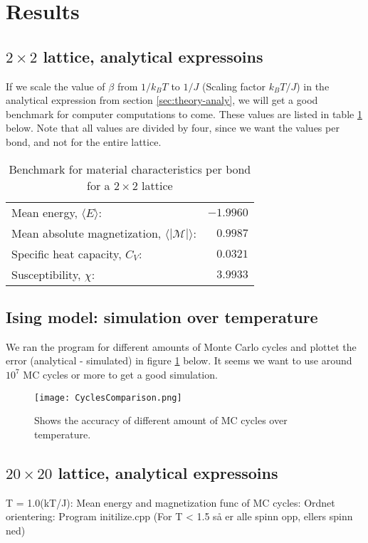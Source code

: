 \documentclass[../main.tex]{subfiles}
\begin{document}
\section{Results}
\subsection{$2 \times 2$ lattice, analytical expressoins}
If we scale the value of $\beta$ from $1/k_BT$ to $1/J$ (Scaling factor $k_B T/J$) in the analytical expression from section \ref{sec:theory-analy}, we will get a good benchmark for computer computations to come. These values are listed in table \ref{tab:2x2spinsEnergiesMags} below. Note that all values are divided by four, since we want the values per bond, and not for the entire lattice.
\begin{table}[!h]
\begin{center}
  \begin{tabular}{l r}
    Mean energy, $\langle E \rangle$: & $-1.9960$  \\
    Mean absolute magnetization, $\langle |\mathcal{M}| \rangle$: & $0.9987$ \\
    Specific heat capacity, $C_V$: & $0.0321$\\
    Susceptibility, $\chi$: & $3.9933$
  \end{tabular}
  \caption{Benchmark for material characteristics per bond for a $2 \times 2$ lattice}
  \label{tab:2x2spinsEnergiesMags}
\end{center}
\end{table}
\FloatBarrier

\subsection{Ising model: simulation over temperature}
We ran the program for different amounts of Monte Carlo cycles and plottet the error (analytical - simulated) in figure \ref{fig:results-MCplot} below. It seems we want to use around $10^{7}$ MC cycles or more to get a good simulation.

\begin{figure}[!h]
\texttt{[image: CyclesComparison.png]}
\caption{Shows the accuracy of different amount of MC cycles over temperature.}
\label{fig:results-MCplot}
\end{figure}
\FloatBarrier

\subsection{$20 \times 20$ lattice, analytical expressoins}
T = 1.0(kT/J):
Mean energy and magnetization func of MC cycles:
Ordnet orientering: Program initilize.cpp (For T < 1.5 så er alle spinn opp,
ellers spinn ned)
\end{document}
